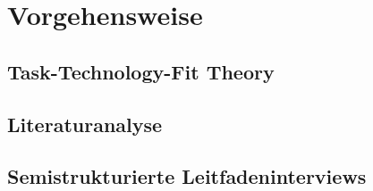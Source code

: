 \clearpage
\chapter{Vorgehensweise}
\section{Task-Technology-Fit Theory}
\section{Literaturanalyse}
\section{Semistrukturierte Leitfadeninterviews}
